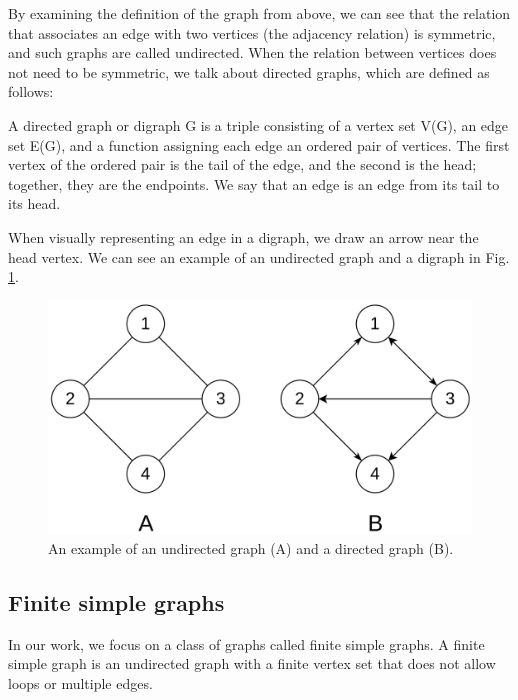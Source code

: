 By examining the definition of the graph from above, we can see that the relation that associates an edge with two vertices (the adjacency relation) is symmetric, and such graphs are called undirected. When the relation between vertices does not need to be symmetric, we talk about directed graphs, which are defined as follows:

\begin{definition}
\label{def:digraph}
A directed graph or digraph G is a triple consisting of a vertex set V(G), an edge set E(G), and a function assigning each edge an ordered pair of vertices. The first vertex of the ordered pair is the tail of the edge, and the second is the head; together, they are the endpoints. We say that an edge is an edge from its tail to its head.
\end{definition}

When visually representing an edge in a digraph, we draw an arrow near the head vertex. We can see an example of an undirected graph and a digraph in Fig. \ref{fig:dir_undir_example}.

\begin{figure}[H]
\includegraphics[width=\textwidth,height=\textheight,keepaspectratio]{images/directed_undirected_graph.png}
\caption{An example of an undirected graph (A) and a directed graph (B).}
\label{fig:dir_undir_example}
\end{figure}

\subsection{Finite simple graphs}

In our work, we focus on a class of graphs called finite simple graphs. A finite simple graph is an undirected graph with a finite vertex set that does not allow loops or multiple edges.

